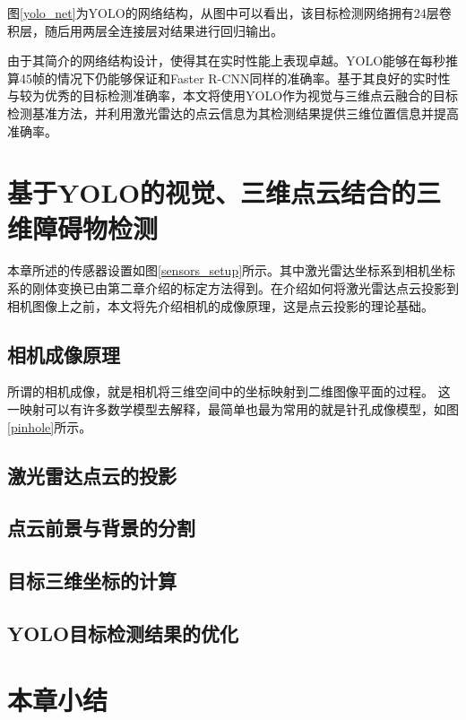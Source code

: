 
图\ref{yolo_net}为YOLO的网络结构，从图中可以看出，该目标检测网络拥有24层卷积层，随后用两层全连接层对结果进行回归输出。

由于其简介的网络结构设计，使得其在实时性能上表现卓越。YOLO能够在每秒推算45帧的情况下仍能够保证和Faster R-CNN同样的准确率。基于其良好的实时性与较为优秀的目标检测准确率，本文将使用YOLO作为视觉与三维点云融合的目标检测基准方法，并利用激光雷达的点云信息为其检测结果提供三维位置信息并提高准确率。

\section{基于YOLO的视觉、三维点云结合的三维障碍物检测}
本章所述的传感器设置如图\ref{sensors_setup}所示。其中激光雷达坐标系到相机坐标系的刚体变换已由第二章介绍的标定方法得到。在介绍如何将激光雷达点云投影到相机图像上之前，本文将先介绍相机的成像原理，这是点云投影的理论基础。


\subsection{相机成像原理}

所谓的相机成像，就是相机将三维空间中的坐标映射到二维图像平面的过程。
这一映射可以有许多数学模型去解释，最简单也最为常用的就是针孔成像模型，如图\ref{pinhole}所示。
\subsection{激光雷达点云的投影}

\subsection{点云前景与背景的分割}

\subsection{目标三维坐标的计算}

\subsection{YOLO目标检测结果的优化}




\section{本章小结}